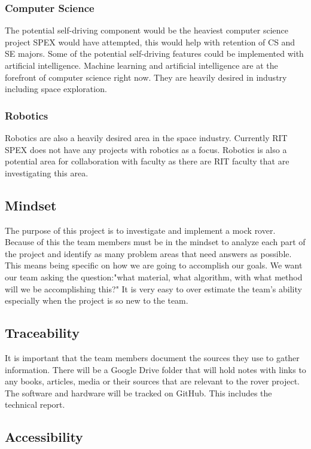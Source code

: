 \documentclass[conference]{IEEEtran} %
\begin{document}
\subsubsection{Computer Science}
\label{cs}
The potential self-driving component would be the heaviest computer science project SPEX would have attempted, this would help with retention of CS and SE majors. 
Some of the potential self-driving features could be implemented with artificial intelligence.
Machine learning and artificial intelligence are at the forefront of computer science right now. 
They are heavily desired in industry including space exploration.
\subsubsection{Robotics}
\label{robotics}
Robotics are also a heavily desired area in the space industry. Currently RIT SPEX does not have any projects with robotics as a focus. Robotics is also a potential area for collaboration with faculty as there are RIT faculty that are investigating this area. 


\subsection{Mindset}
\label{subsec:mindset}
The purpose of this project is to investigate and implement a mock rover.
Because of this the team members must be in the mindset to analyze each part of the project and identify as many problem areas that need answers as possible. 
This means being specific on how we are going to accomplish our goals.
We want our team asking the question:"what material, what algorithm, with what method will we be accomplishing this?"
It is very easy to over estimate the team's ability especially when the project is so new to the team.

\subsection{Traceability}
\label{subsec:traceability}

It is important that the team members document the sources they use to gather information. 
There will be a Google Drive folder that will hold notes with links to any books, articles, media or their sources that are relevant to the rover project. 
The software and hardware will be tracked on GitHub. 
This includes the technical report.

\subsection{Accessibility}
\label{subsec:plug-n-play}
\end{document}

